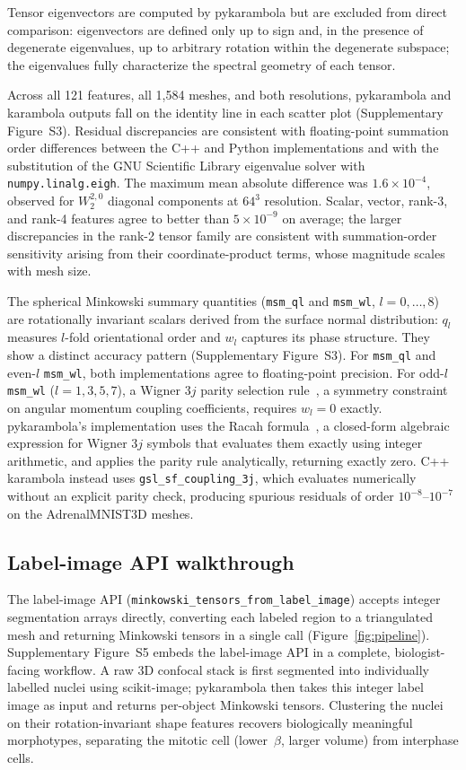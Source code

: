 \documentclass[unnumsec,webpdf,contemporary,large,namedate]{oup-authoring-template}
\begin{document}
Tensor eigenvectors are computed by pykarambola but are excluded from
direct comparison: eigenvectors are defined only up to sign and, in the presence
of degenerate eigenvalues, up to arbitrary rotation within the degenerate
subspace; the eigenvalues fully characterize the spectral geometry of each tensor.

Across all 121 features, all 1{,}584 meshes, and both resolutions,
pykarambola and karambola outputs fall on the identity line in
each scatter plot (Supplementary Figure~S3).
Residual discrepancies are consistent with floating-point summation order
differences between the C++ and Python implementations and with the substitution
of the GNU Scientific Library eigenvalue solver with \texttt{numpy.linalg.eigh}.
The maximum mean absolute difference was $1.6 \times 10^{-4}$, observed for
$W_2^{2,0}$ diagonal components at $64^3$ resolution.
Scalar, vector, rank-3, and rank-4 features agree to better than
$5 \times 10^{-9}$ on average; the larger discrepancies in the rank-2 tensor
family are consistent with summation-order sensitivity arising from their
coordinate-product terms, whose magnitude scales with mesh size.

The spherical Minkowski summary quantities (\texttt{msm\_ql} and
\texttt{msm\_wl}, $l = 0, \ldots, 8$) are rotationally invariant scalars derived
from the surface normal distribution: $q_l$ measures $l$-fold orientational order
and $w_l$ captures its phase structure.
They show a distinct accuracy pattern (Supplementary Figure~S3).
For \texttt{msm\_ql} and even-$l$ \texttt{msm\_wl}, both implementations agree
to floating-point precision.
For odd-$l$ \texttt{msm\_wl} ($l = 1, 3, 5, 7$), a Wigner $3j$ parity selection
rule~\citep{Steinhardt1983, Varshalovich1988}, a symmetry constraint on angular
momentum coupling coefficients, requires $w_l = 0$ exactly.
pykarambola's implementation uses the Racah formula~\citep{Varshalovich1988},
a closed-form algebraic expression for Wigner $3j$ symbols that evaluates
them exactly using integer arithmetic, and applies the parity rule
analytically, returning exactly zero.
C++ karambola instead uses \texttt{gsl\_sf\_coupling\_3j}, which
evaluates numerically without an explicit parity check, producing spurious
residuals of order $10^{-8}$--$10^{-7}$ on the AdrenalMNIST3D meshes.


\subsection{Label-image API walkthrough}
The label-image API (\texttt{minkowski\_tensors\_from\_label\_image}) accepts integer segmentation arrays directly, converting each labeled region to a triangulated mesh and returning Minkowski tensors in a single call (Figure~\ref{fig:pipeline}).
Supplementary Figure~S5 embeds the label-image API in a complete, biologist-facing workflow. A raw 3D confocal stack is first segmented into individually labelled nuclei using scikit-image; pykarambola then takes this integer label image as input and returns per-object Minkowski tensors.
Clustering the nuclei on their rotation-invariant shape features recovers biologically meaningful morphotypes, separating the mitotic cell (lower~$\beta$, larger volume) from interphase cells.
\end{document}
